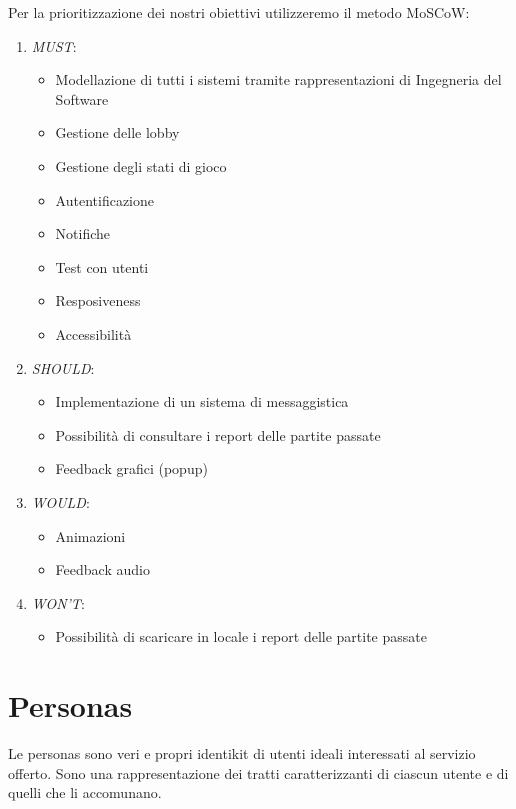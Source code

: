 \noindent Per la prioritizzazione dei nostri obiettivi utilizzeremo il metodo MoSCoW:
\begin{enumerate}
    \item \textit{MUST}:     
    \begin{itemize}
        \item Modellazione di tutti i sistemi tramite rappresentazioni di Ingegneria del Software
        \item Gestione delle lobby
        \item Gestione degli stati di gioco      
        \item Autentificazione
        \item Notifiche
        \item Test con utenti
        \item Resposiveness
        \item Accessibilità
    \end{itemize}
    \item \textit{SHOULD}: 
    \begin{itemize}
        \item Implementazione di un sistema di messaggistica
        \item Possibilità di consultare i report delle partite passate
        \item Feedback grafici (popup)
    \end{itemize}
    \item \textit{WOULD}:
        \begin{itemize}
            \item Animazioni
            \item Feedback audio
        \end{itemize}
    \item \textit{WON'T}:     
    \begin{itemize}
        \item Possibilità di scaricare in locale i report delle partite passate
    \end{itemize}
\end{enumerate}

\section{Personas}
Le personas sono veri e propri identikit di utenti ideali interessati al servizio offerto. Sono una rappresentazione dei tratti caratterizzanti di ciascun utente e di quelli che li accomunano.\newline

